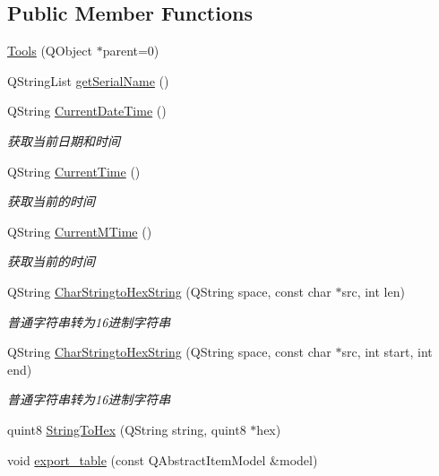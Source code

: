 \subsection*{Public Member Functions}
\begin{DoxyCompactItemize}
\item 
\mbox{\hyperlink{class_tools_a812eaff6fdce0fe489279f72c06e83e3}{Tools}} (Q\+Object $\ast$parent=0)
\item 
Q\+String\+List \mbox{\hyperlink{class_tools_ac18eb440bd7a33e8e242df2cc4d4d4bc}{get\+Serial\+Name}} ()
\item 
Q\+String \mbox{\hyperlink{class_tools_a438ea9326a6ae735d51bc3508c430a3b}{Current\+Date\+Time}} ()
\begin{DoxyCompactList}\small\item\em 获取当前日期和时间 \end{DoxyCompactList}\item 
Q\+String \mbox{\hyperlink{class_tools_af10c90501143838d9af896a60026668d}{Current\+Time}} ()
\begin{DoxyCompactList}\small\item\em 获取当前的时间 \end{DoxyCompactList}\item 
Q\+String \mbox{\hyperlink{class_tools_a70173de28152ff05b140b9895de99e20}{Current\+M\+Time}} ()
\begin{DoxyCompactList}\small\item\em 获取当前的时间 \end{DoxyCompactList}\item 
Q\+String \mbox{\hyperlink{class_tools_a89da3511a27330d893d495ddc6160a91}{Char\+Stringto\+Hex\+String}} (Q\+String space, const char $\ast$src, int len)
\begin{DoxyCompactList}\small\item\em 普通字符串转为16进制字符串 \end{DoxyCompactList}\item 
Q\+String \mbox{\hyperlink{class_tools_ae4c5caed900acc0c2ca436929a753dff}{Char\+Stringto\+Hex\+String}} (Q\+String space, const char $\ast$src, int start, int end)
\begin{DoxyCompactList}\small\item\em 普通字符串转为16进制字符串 \end{DoxyCompactList}\item 
quint8 \mbox{\hyperlink{class_tools_a724c823ede8cd11880888f64b1a3c4df}{String\+To\+Hex}} (Q\+String string, quint8 $\ast$hex)
\item 
void \mbox{\hyperlink{class_tools_af6c4eaadfb21ee231cbc4d6384250629}{export\+\_\+table}} (const Q\+Abstract\+Item\+Model \&model)
\end{DoxyCompactItemize}
